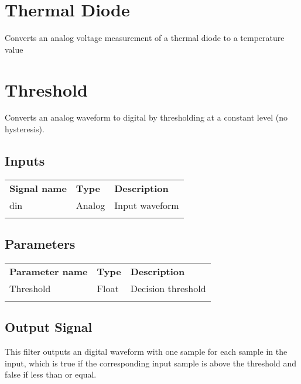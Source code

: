 \pagebreak
\section{Thermal Diode}

Converts an analog voltage measurement of a thermal diode to a temperature value

\pagebreak
\section{Threshold}

Converts an analog waveform to digital by thresholding at a constant level (no hysteresis).

\subsection{Inputs}

\begin{tabularx}{16cm}{llX}
\thickhline
\textbf{Signal name} & \textbf{Type} & \textbf{Description} \\
\thickhline
din & Analog & Input waveform \\
\thickhline
\end{tabularx}

\subsection{Parameters}

\begin{tabularx}{16cm}{llX}
\thickhline
\textbf{Parameter name} & \textbf{Type} & \textbf{Description} \\
\thickhline
Threshold & Float & Decision threshold \\
\thickhline
\end{tabularx}

\subsection{Output Signal}

This filter outputs an digital waveform with one sample for each sample in the input, which is true if the
corresponding input sample is above the threshold and false if less than or equal.

